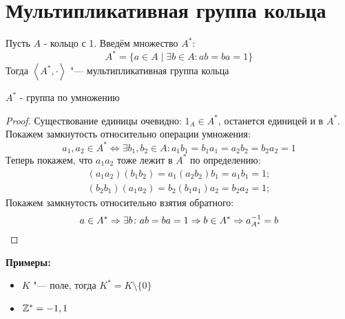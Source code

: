 \section{Мультипликативная группа кольца}

\begin{Def}	 
	Пусть $A$ - кольцо с 1.
	Введём множество $A^*$:
	\[A^* = \{ a \in A \mid \exists b \in A \colon ab = ba = 1 \}\]
	Тогда $\left<A^*, \cdot\right>$ "--- мультипликативная группа кольца\\
\end{Def}

\begin{theorem}{}
	$A^*$ - группа по умножению\\
\end{theorem}
\begin{proof}
	Существование единицы очевидно: $1_A \in A^*$, останется единицей и в $A^*$.
	Покажем замкнутость относительно операции умножения:
	\[a_1, a_2 \in A^* \iff \exists b_1, b_2 \in A \colon a_1b_1=b_1a_1=a_2b_2=b_2a_2 = 1\]
	Теперь покажем, что $a_1a_2$ тоже лежит в $A^*$ по определению:
	\begin{gather*}
	(a_1a_2)(b_1b_2) = a_1(a_2b_2)b_1 = a_1b_1 = 1; \\
	(b_2b_1)(a_1a_2) = b_2(b_1a_1)a_2 = b_2a_2 = 1;
	\end{gather*}
	Покажем замкнутость относительно взятия обратного:
	\[ a \in A^* \Rightarrow \exists b \colon ab = ba = 1 \Rightarrow b \in A^* \Rightarrow a^{-1}_{A^*} = b \]
\end{proof}
	 
\textbf{ Примеры: }
\begin{itemize}
	\item $K$ "--- поле, тогда $K^* = K \setminus \{ 0 \}$
	\item $\mathbb{Z}^* = {-1, 1}$
\end{itemize}
